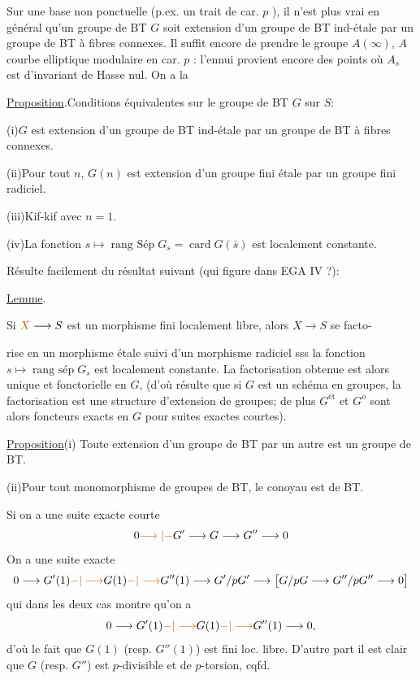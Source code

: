 Sur une base non ponctuelle (p.ex. un trait de car. $p$ ), il n'est plus vrai en général qu'un groupe de BT $G$  soit extension d'un groupe de BT ind-étale par un groupe de BT à fibres connexes. Il suffit encore de prendre le groupe  $A(\infty)$, $A$ courbe elliptique modulaire en car. $p$ : l'ennui provient encore des points où $A_s$ est d'invariant de Hasse nul. On a la

\uline{Proposition}.\quad Conditions équivalentes sur le groupe de BT $G$ sur $S$:

(i)\quad $G$ est extension d'un groupe de BT ind-étale par un groupe de BT à fibres connexes.

(ii)\quad Pour tout $n$, $G(n)$ est extension d'un groupe fini étale par un groupe fini radiciel.

(iii)\quad Kif-kif avec $n=1$.

(iv)\quad La fonction $s\mapsto\operatorname{rang\ Sép}G_s=\operatorname{card}G(\bar{s})$ est localement constante.

Résulte facilement du résultat suivant (qui figure dans EGA IV ?):

\uline{Lemme}.

Si $\unsure{X}\longrightarrow S$ est un morphisme fini localement libre, alors $X\longrightarrow S$ se facto-

rise en un morphisme  étale suivi d'un morphisme radiciel sss la fonction $s\mapsto\operatorname{rang\ sép}G_s$ est localement constante. La factorisation obtenue est alors unique et fonctorielle en $G$,  (d'où résulte que si $G$ est un schéma en groupes, la factorisation est une structure d'extension de groupes; de plus $G^{\mathrm{ét}}$ et $G^o$ sont alors foncteurs exacts en $G$ pour suites exactes courtes).

\uline{Proposition}\quad (i) Toute extension d'un groupe de BT par un autre est un groupe de BT.

(ii)\quad Pour tout monomorphisme de groupes de BT, le conoyau est de BT.


 Si on a une suite exacte courte
\[
0\unsure{\longrightarrow|-}G'\longrightarrow G\longrightarrow G''\longrightarrow0
\]
 On a une suite exacte
\[
0\longrightarrow G'(1)\unsure{-|\longrightarrow}G(1)\unsure{-|\longrightarrow}G''(1)\longrightarrow G'/pG'
\longrightarrow\bigl[G/pG\longrightarrow G''/pG''\longrightarrow0\bigr]
\]
qui dans les deux cas  montre qu'on a
\[
0\longrightarrow G'(1)\unsure{-|\longrightarrow}G(1)\unsure{-|\longrightarrow}G''(1)\longrightarrow0,
\]
d'où le fait que $G(1)$ (resp. $G''(1)$) est fini loc. libre. D'autre part il est clair que $G$ (resp. $G''$) est $p$-divisible et de $p$-torsion, cqfd.

